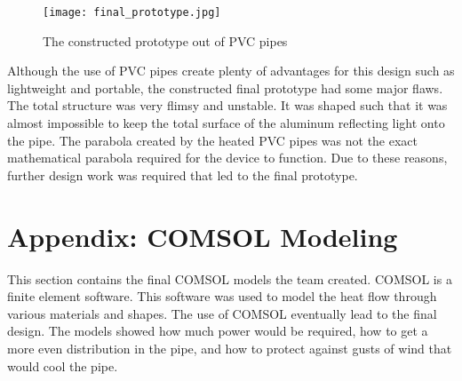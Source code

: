 \documentclass[11pt,english]{article}
\begin{document}
\begin{figure}[ht!]
\centering
\texttt{[image: final\_prototype.jpg]}
\caption{The constructed prototype out of PVC pipes}
\label{fig:PVCprototype}
\end{figure}

\newpage
\noindent Although the use of PVC pipes create plenty of advantages for this design such as lightweight and portable, the constructed final prototype had some major flaws. The total structure was very flimsy and unstable. It was shaped such that it was almost impossible to keep the total surface of the aluminum reflecting light onto the pipe. The parabola created by the heated PVC pipes was not the exact mathematical parabola required for the device to function. Due to these reasons, further design work was required that led to the final prototype.

\newpage
\section{Appendix: COMSOL Modeling}
This section contains the final COMSOL models the team created. COMSOL is a finite element software. This software was used to model the heat flow through various materials and shapes. The use of COMSOL eventually lead to the final design. The models showed how much power would be required, how to get a more even distribution in the pipe, and how to protect against gusts of wind that would cool the pipe.
\end{document}
